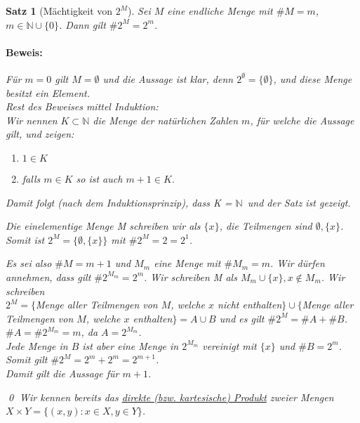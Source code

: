 \documentclass{report}
\newcommand{\N}{\mathbb{N}}
\newcommand{\mN}{$\mathbb{N}$}
\theoremstyle{customrem}
\theoremstyle{customdef}
\newtheorem{satz}[definition]{Satz}
\renewenvironment{proof}{\paragraph{Beweis: }}{\qed}
\begin{document}
	\begin{satz}[Mächtigkeit von $2^M$]
		Sei $M$ eine endliche Menge mit $\#M = m$, $m \in \N \cup \{0\}$. Dann gilt $\#2^M = 2^m$.\\
		\begin{proof}
			Für $m = 0$ gilt $M = \emptyset$ und die Aussage ist klar, denn $2^\emptyset = \{\emptyset\}$, und diese Menge besitzt ein Element.\\
			Rest des Beweises mittel Induktion:\\
			Wir nennen $K \subset \N$ die Menge der natürlichen Zahlen $m$, für welche die Aussage gilt, und zeigen:
			\begin{enumerate}
				\itemsep0cm
				\item $1 \in K$
				\item falls $m \in K$ so ist auch $m + 1 \in K$.
			\end{enumerate}
			Damit folgt (nach dem Induktionsprinzip), dass  K = \mN\ und der Satz ist gezeigt.\\
			\begin{description}[labelindent = 12pt, labelwidth = 1.0cm, leftmargin = 1.0cm]
				\item[Zu 1.:] Die einelementige Menge M schreiben wir als $\{x\}$, die Teilmengen sind $\emptyset, \{x\}$. Somit ist $2^M = \{\emptyset, \{x\}\}$ mit $\#2^M = 2 = 2^1$.
				\item[Zu 2.:] Es sei also $\#M = m + 1$  und $M_m$ eine Menge mit $\# M_m = m$. Wir dürfen annehmen, dass gilt $\#2^{M_m} = 2^m$. Wir schreiben M als $M_m \cup \{x\}, x \not\in M_m$. Wir schreiben\\
				$2^M = \{$Menge aller Teilmengen von $M$, welche $x$ nicht enthalten$\} \cup \{$Menge aller Teilmengen von $M$, welche $x$ enthalten$\} = A \cup B$ und es gilt $\#2^M = \#A + \#B$.\\
				$\#A = \#2^{M_m} = m$, da $A = 2^{M_m}$.\\
				Jede Menge in $B$ ist aber eine Menge in $2^{M_m}$ vereinigt mit $\{x\}$ und $\#B = 2^m$. Somit gilt $\#2^M = 2^m + 2^m = 2^{m + 1}$.\\
				Damit gilt die Aussage für $m + 1$.
			\end{description}
		\end{proof}
		Wir kennen bereits das \hyperref[defmengenoperationen]{direkte (bzw. kartesische) Produkt} zweier Mengen $X \times Y = \{(x, y) : x\in X, y \in Y\}$.\\
	\end{satz}
	
\end{document}
